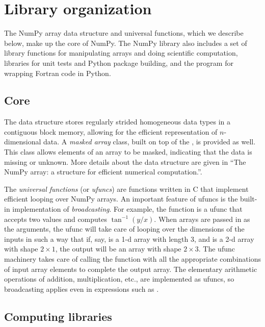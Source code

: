 \section*{Library organization}

The NumPy array data structure and universal functions, which we describe
below, make up the core of NumPy.
The NumPy library also includes
a set of library functions for manipulating arrays and doing scientific computation,
libraries for unit tests and Python package building,
and the program \cite{peterson2009f2py} for wrapping Fortran code in Python.

\subsection*{Core}

The  data structure stores regularly strided homogeneous data
types in a contiguous block memory, allowing for the efficient representation
of $n$-dimensional data.
A \emph{masked array} class, built on top of the , is
provided as well. This class allows elements of an array to be masked,
indicating that the data is missing or unknown.
More details about the data structure are given in ``The NumPy array:
a structure for efficient numerical computation.''\cite{vanderwalt2011numpy}.

The \emph{universal functions} (or \emph{ufuncs})
are functions written in C that implement efficient looping over
NumPy arrays. An important feature of ufuncs is the built-in
implementation of \emph{broadcasting}.  For example, the function
 is a ufunc that accepts two values and computes
$\tan^{-1}(y/x)$.  When arrays are passed in as the arguments,
the ufunc will take care of looping over the dimensions of the inputs
in such a way that if, say,  is a 1-d array with length 3, and
 is a 2-d array with shape $2 \times 1$, the output will be
an array with shape $2 \times 3$.  The ufunc machinery takes care
of calling the function with all the appropriate combinations of
input array elements to complete the output array.
The elementary arithmetic operations of addition, multiplication, etc.,
are implemented as ufuncs, so broadcasting applies even in expressions
such as .

\subsection*{Computing libraries}

